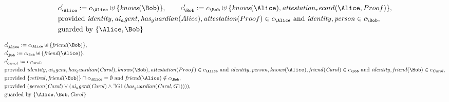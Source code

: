 \begin{align*}
&
c'_
{
\Alice
}
 := 
c_
{
\Alice
}
 \uplus 
\{
\mathit{
knows
}
(
\Bob
)
\}
, \qquad 
c'_
{
\Bob
}
 := 
c_
{
\Bob
}
 \uplus 
\{
\mathit{
knows
}
(
\Alice
)
,
\mathit{
attestation_record
}
(
\Alice
,
Proof
)
\}
,\\
&
\text{provided } 
\mathit{
identity
}
,
\mathit{
ai_agent
}
,
\mathit{
has_guardian
}
(
Alice
)
,
\mathit{
attestation
}
(
Proof
)
 \in c_
{
\Alice
}
 \text{ and } 
\mathit{
identity
}
,
\mathit{
person
}
 \in c_
{
\Bob
}
,\\
&
\text{guarded by } \{
\Alice
,
\Bob
\}
\end{align*}

\begin{align*}
&
c'_
{
\Alice
}
 := 
c_
{
\Alice
}
 \uplus 
\{
\mathit{
friend
}
(
\Bob
)
\}
,\\
&
c'_
{
\Bob
}
 := 
c_
{
\Bob
}
 \uplus 
\{
\mathit{
friend
}
(
\Alice
)
\}
,\\
&
c'_
{
\mathit{Carol}
}
 := 
c_
{
\mathit{Carol}
}
,\\
&
\text{provided } 
\mathit{
identity
}
,
\mathit{
ai_agent
}
,
\mathit{
has_guardian
}
(
\mathit{Carol}
)
,
\mathit{
knows
}
(
\Bob
)
,
\mathit{
attestation
}
(
Proof
)
 \in c_
{
\Alice
}
 \text{ and } 
\mathit{
identity
}
,
\mathit{
person
}
,
\mathit{
knows
}
(
\Alice
)
,
\mathit{
friend
}
(
\mathit{Carol}
)
 \in c_
{
\Bob
}
 \text{ and } 
\mathit{
identity
}
,
\mathit{
friend
}
(
\Bob
)
 \in c_
{
\mathit{Carol}
}
,\\
&
\text{provided } 
\{
\mathit{
retired
}
,
\mathit{
friend
}
(
\Bob
)
\}
 \cap c_
{
\Alice
}
 = \emptyset
 \text{ and } 
\mathit{
friend
}
(
\Alice
)
 \notin c_
{
\Bob
}
,\\
&
\text{provided } 
(
\mathit{
person
}
(
\mathit{Carol}
)
\lor
(
\mathit{
ai_agent
}
(
\mathit{Carol}
)
\land
\exists 
G1
\,(
\mathit{
has_guardian
}
(
\mathit{Carol}
,
G1
)
)
)
)
,\\
&
\text{guarded by } \{
\Alice
,
\Bob
,
\mathit{Carol}
\}
\end{align*}

